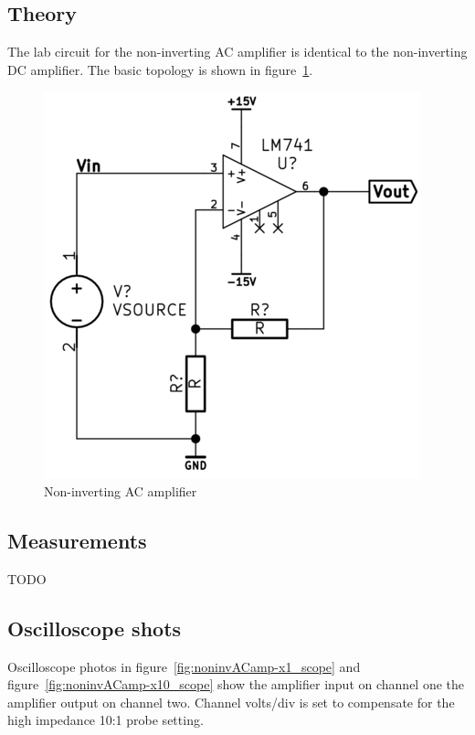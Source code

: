 \documentclass[11pt,a4paper]{article}
\begin{document}
\subsection{Theory}\label{noninvAC-theory}
The lab circuit for the non-inverting AC amplifier is identical to the
non-inverting DC amplifier. The basic topology is shown in
figure~\ref{fig:noninvACamp}.

\begin{figure}[htbp]
    \centering
    \includegraphics[scale=0.5]{img/noninvACamp.png}
    \caption{Non-inverting AC amplifier}
    \label{fig:noninvACamp}
\end{figure}


\subsection{Measurements}\label{measurements-3}
TODO


\subsection{Oscilloscope shots}\label{invAC-oscilloscope-shots}
Oscilloscope photos in figure~\ref{fig:noninvACamp-x1_scope} and
figure~\ref{fig:noninvACamp-x10_scope} show the amplifier input on channel one
the amplifier output on channel two.  Channel volts/div is set to compensate
for the high impedance 10:1 probe setting. 
\end{document}
